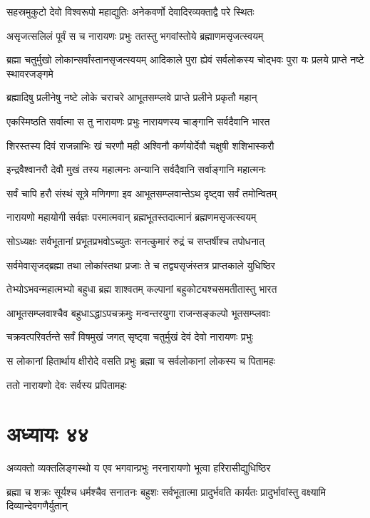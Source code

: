 \twolineshloka
{सहस्रमुकुटो देवो विश्वरूपो महाद्युतिः}
{अनेकवर्णो देवादिरव्यक्ताद्वै परे स्थितः}


\twolineshloka
{असृजत्सलिलं पूर्वं स च नारायणः प्रभुः}
{ततस्तु भगवांस्तोये ब्रह्माणमसृजत्स्वयम्}


\threelineshloka
{ब्रह्मा चतुर्मुखो लोकान्सर्वांस्तानसृजत्स्वयम्}
{आदिकाले पुरा ह्येवं सर्वलोकस्य चोद्भवः}
{पुरा यः प्रलये प्राप्ते नष्टे स्थावरजङ्गमे}


\twolineshloka
{ब्रह्मादिषु प्रलीनेषु नष्टे लोके चराचरे}
{आभूतसम्प्लवे प्राप्ते प्रलीने प्रकृतौ महान्}


\twolineshloka
{एकस्मिष्ठति सर्वात्मा स तु नारायणः प्रभुः}
{नारायणस्य चाङ्गानि सर्वदैवानि भारत}


\twolineshloka
{शिरस्तस्य दिवं राजन्नाभिः खं चरणौ मही}
{अश्विनौ कर्णयोर्देवौ चक्षुषी शशिभास्करौ}


\twolineshloka
{इन्द्रवैश्वानरौ देवौ मुखं तस्य महात्मनः}
{अन्यानि सर्वदैवानि सर्वाङ्गानि महात्मनः}


\twolineshloka
{सर्वं चापि हरौ संस्थं सूत्रे मणिगणा इव}
{आभूतसम्प्लवान्तेऽथ दृष्ट्वा सर्वं तमोन्वितम्}


\twolineshloka
{नारायणो महायोगी सर्वज्ञः परमात्मवान्}
{ब्रह्मभूतस्तदात्मानं ब्रह्मणमसृजत्स्वयम्}


\twolineshloka
{सोऽध्यक्षः सर्वभूतानां प्रभूतप्रभवोऽच्युतः}
{सनत्कुमारं रुद्रं च सप्तर्षीश्च तपोधनात्}


\twolineshloka
{सर्वमेवासृजद्ब्रह्मा तथा लोकांस्तथा प्रजाः}
{ते च तद्व्यसृजंस्तत्र प्राप्तकाले युधिष्ठिर}


\twolineshloka
{तेभ्योऽभवन्महात्मभ्यो बहुधा ब्रह्म शाश्वतम्}
{कल्पानां बहुकोट्यश्चसमतीतास्तु भारत}


\twolineshloka
{आभूतसम्प्लवाश्चैव बहुधाऽद्धाऽपचक्रमुः}
{मन्वन्तरयुगा राजन्सङ्कल्पो भूतसम्प्लवाः}


\twolineshloka
{चक्रवत्परिवर्तन्ते सर्वं विषमुखं जगत्}
{सृष्ट्वा चतुर्मुखं देवं देवो नारायणः प्रभुः}


\twolineshloka
{स लोकानां हितार्थाय क्षीरोदे वसति प्रभुः}
{ब्रह्मा च सर्वलोकानां लोकस्य च पितामहः}


\twolineshloka
{ततो नारायणो देवः सर्वस्य प्रपितामहः}
{}


\chapter{अध्यायः ४४}
\twolineshloka
{अव्यक्तो व्यक्तलिङ्गस्थो य एव भगवान्प्रभुः}
{नरनारायणो भूत्वा हरिरासीद्युधिष्ठिर}


\fourlineindentedshloka
{ब्रह्मा च शक्रः सूर्यश्च धर्मश्चैव सनातनः}
{बहुशः सर्वभूतात्मा प्रादुर्भवति कार्यतः}
{प्रादुर्भावांस्तु वक्ष्यामि दिव्यान्देवगणैर्युतान्}
{}


